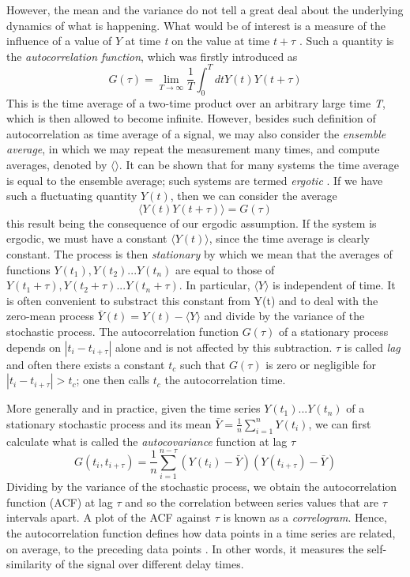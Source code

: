\documentclass[12pt,a4paper]{report}
\begin{document}
However, the mean and the variance do not tell a great deal about the underlying dynamics of what is happening. What would be of interest is a measure of the influence of a value of $Y$ at time \emph{t} on the value at time $t + \tau$ \cite{Hand}. Such a quantity is the \emph{autocorrelation function}, which was firstly introduced as
\begin{equation}
    G(\tau) = \lim_{T\to\infty}\frac{1}{T}\int_{0}^{T}dt Y(t)Y(t+\tau) 
\end{equation}
This is the time average of a two-time product over an arbitrary large time \emph{T}, which is then allowed to become infinite. However, besides such definition of autocorrelation as time average of a signal, we may also consider the \emph{ensemble average}, in which we may repeat the measurement many times, and compute averages, denoted by $\langle \rangle$. It can be shown that for many systems the time average is equal to the ensemble average; such systems are termed \emph{ergotic} \cite{Hand}. If we have such a fluctuating quantity $Y(t)$, then we can consider the average
\begin{equation}
    \langle Y(t)Y(t+\tau) \rangle = G(\tau)
\end{equation}
this result being the consequence of our ergodic assumption. If the system is ergodic, we must have a constant $\langle Y(t) \rangle$, since the time average is clearly constant. The process is then \emph{stationary} by which we mean that the averages of functions $Y(t_{1}),Y(t_{2})...Y(t_{n})$ are equal to those of $Y(t_{1}+\tau),Y(t_{2}+\tau)...Y(t_{n}+\tau)$. In particular, $\langle Y \rangle$ is independent of time.  It is often convenient to substract this constant from Y(t) and to deal with the zero-mean process $\bar{Y}(t) = Y(t) - \langle Y \rangle$ and divide by the variance of the stochastic process. The autocorrelation function $G(\tau)$ of a stationary process depends on $|t_{i}-t_{i+\tau}|$ alone and is not affected by this subtraction. $\tau$ is called \emph{lag} and often there exists a constant $t_{c}$ such that $G(\tau)$ is zero or negligible for $|t_{i}-t_{i+\tau}|> t_{c}$; one then calls $t_{c}$ the autocorrelation time.


More generally and in practice, given the time series $Y(t_{1})...Y(t_{n})$ of a stationary stochastic process and its mean $\bar{Y}= \frac{1}{n}\sum_{i=1}^{n} Y(t_{i}) $, we can first calculate what is called the \emph{autocovariance} function at lag $\tau$
    \begin{equation}
        G(t_{i},t_{i+\tau}) = \frac{1}{n}\sum_{i=1}^{n-\tau}(Y(t_{i})-\bar{Y})(Y(t_{i+\tau})-\bar{Y})
    \end{equation}
Dividing by the variance of the stochastic process, we obtain the autocorrelation function (ACF) at lag $\tau$ and so the correlation between  series values that are $\tau$ intervals apart. A plot of the ACF against $\tau$ is known as a \emph{correlogram}. Hence, the autocorrelation function defines how data points in a time series are related, on average, to the preceding data points \cite{ACF}. In other words, it measures the self-similarity of the signal over different delay times.
\end{document}
